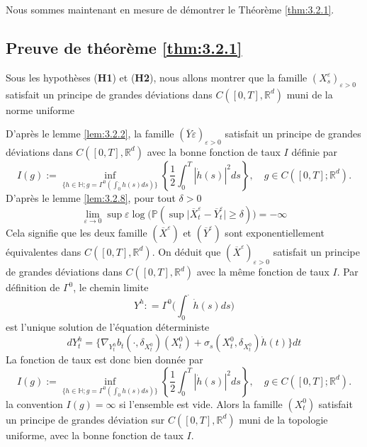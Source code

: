 \documentclass[12pt,a4paper,twoside]{report}%
\theoremstyle{definition}
\numberwithin{equation}{section}
\begin{document}
Nous sommes maintenant en mesure de démontrer le Théorème \ref{thm:3.2.1}. 	
	 	
\subsection*{Preuve de théorème \ref{thm:3.2.1}}	 	
Sous les hypothèses (\textbf{H1}) et (\textbf{H2}), nous allons montrer que la famille $(X_s^\varepsilon)_{\varepsilon>0}$ satisfait un principe de grandes déviations dans $C([0,T],\mathbb{R}^d)$ muni de la norme uniforme

D'après le lemme \ref{lem:3.2.2}, la famille $(\overline{Y}\varepsilon)_{\varepsilon>0}$ satisfait un principe de grandes déviations dans $C([0,T],\mathbb{R}^d)$ avec la bonne fonction de taux $I$ définie par
\[
	I(g) := \inf_{\{h \in \mathbb{H}; g = \Gamma^0 (\int_{0}^{.} h(s) ds)\}} \left\{ \frac{1}{2} \int_0^T |\dot{h}(s)|^2 ds \right\}, \quad g \in C([0, T]; \mathbb{R}^d).
\]
D'après le lemme \ref{lem:3.2.8}, pour tout $\delta>0$ 
\[
\lim_{\varepsilon\to 0}\sup\varepsilon\log\big(\mathbb{P}(\sup\big|\overline{X}_t^\varepsilon-\overline{Y}_t^\varepsilon\big|\geq\delta)\big)=-\infty
\] 	 	
Cela signifie que les deux famille $(\overline{X}^\varepsilon)$ et $(\overline{Y}^\varepsilon)$ sont exponentiellement équivalentes dans $C([0,T],\mathbb{R}^d)$. On déduit que $(\overline{X}^\varepsilon)_{\varepsilon>0}$ satisfait un principe de grandes déviations dans $C([0,T],\mathbb{R}^d)$ avec la même fonction de taux $I$.
Par définition de $\Gamma^0$, le chemin limite 
\[
Y^h : =\Gamma^0\big(\int_{0}^{\cdot}\dot{h}(s)ds\big)
\]	 	
est l'unique solution de l'équation déterministe
\[
dY^h_t = \big\{ \nabla_{Y^h_t}b_t(\cdot,\delta_{{X}_t^0})(X_t^0) + \sigma_s(X_t^0,\delta_{{X}_t^0})\dot{h}(t)
\big\}dt
\]	 	
La fonction de taux est donc bien donnée par
\[
I(g) := \inf_{\{h \in \mathbb{H}; g = \Gamma^0 (\int_{0}^{.} h(s) ds)\}} \left\{ \frac{1}{2} \int_0^T |\dot{h}(s)|^2 ds \right\}, \quad g \in C([0, T]; \mathbb{R}^d).
\]
la convention $I(g)=\infty$ si l'ensemble est vide. Alors la famille $(X_t^0)$ satisfait un principe de grandes déviation sur $C([0,T],\mathbb{R}^d)$ muni de la topologie uniforme, avec la bonne fonction de taux $I$.
	 	
	 	
	 	
	 	
	 	
	 	
	 	
	 	
	 	
	 	
\end{document}
